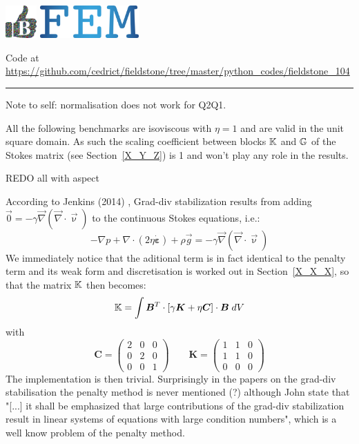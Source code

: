 \includegraphics[height=1.25cm]{images/pictograms/benchmark}
\includegraphics[height=1.25cm]{images/pictograms/FEM}


%

\begin{center}
Code at \url{https://github.com/cedrict/fieldstone/tree/master/python_codes/fieldstone_104}
\end{center}

\par\noindent\rule{\textwidth}{0.4pt}



Note to self: normalisation does not work for Q2Q1.

All the following benchmarks are isoviscous with $\eta=1$ and are valid in the unit square domain. 
As such the scaling coefficient between blocks ${\mathbb{K}}$ and ${\mathbb{G}}$ of the Stokes matrix (see Section~\ref{X_Y_Z}) 
is 1 and won't play any role in the results. 

REDO all with aspect

According to Jenkins \etal (2014) \cite{jejl14}, Grad-div stabilization results from adding
$\vec{0} = - \gamma \vec\nabla (\vec\nabla\cdot \vec\upnu)$ to the continuous Stokes
equations, i.e.:
\[
-\nabla p  + \nabla \cdot ( 2 \eta \dot{\bm \varepsilon}) + \rho \vec{g} 
= - \gamma \vec\nabla (\vec\nabla\cdot \vec\upnu)
\]
We immediately notice that the aditional term is in fact identical to the penalty term and 
its weak form and discretisation is worked out in Section~\ref{X_X_X}, so that 
the matrix ${\mathbb{K}}$ then becomes:
\[
{\mathbb{K}} = \int {\bm B}^T \cdot [ \gamma {\bm K} + \eta {\bm C} ] \cdot {\bm B} \; dV
\]
with 
\[
{\bm C}=
\left(
\begin{array}{ccc}
2 & 0 & 0 \\
0 & 2 & 0 \\
0 & 0 & 1 
\end{array}
\right)
\qquad
{\bm K}=
\left(
\begin{array}{ccc}
1 & 1 & 0 \\
1 & 1 & 0 \\
0 & 0 & 0 
\end{array}
\right)
\]
The implementation is then trivial. Surprisingly in the papers on the grad-div stabilisation 
the penalty method is never mentioned (?) although John \etal state that 
"[...] it shall be emphasized that large
contributions of the grad-div stabilization result in linear systems of equations with
large condition numbers", which is a well know problem of the penalty method.

